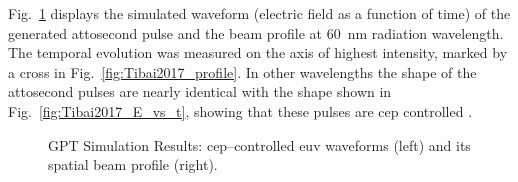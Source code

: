 Fig.~\ref{fig:Tibai2017} displays the simulated waveform (electric field as
a function of time)  of the generated attosecond
pulse and the beam profile at \SI{60}{\nano\metre} radiation wavelength. The
temporal evolution was measured on the axis of highest intensity, marked by  a
cross in Fig.~\ref{fig:Tibai2017_profile}. In other
wavelengths the shape of the attosecond pulses are nearly identical with the
shape shown in Fig.~\ref{fig:Tibai2017_E_vs_t}, showing that these pulses are
\gls{cep} controlled \cite{Tibai2017}.
%
\begin{figure}[ht]
  \caption{GPT Simulation Results: \gls{cep}--controlled \gls{euv} waveforms (left) and its spatial beam
    profile (right).}
    \label{fig:Tibai2017}
\end{figure}

